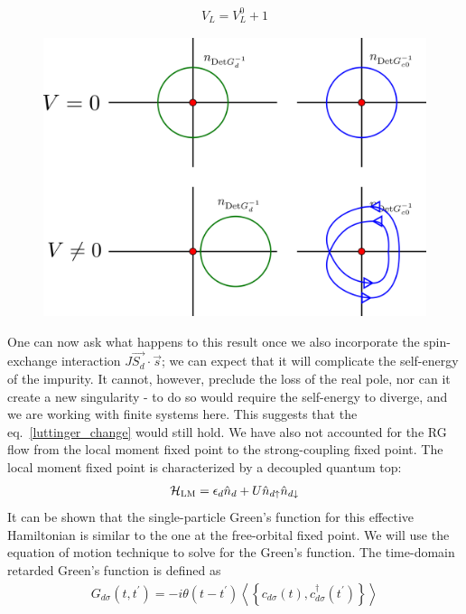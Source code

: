 \documentclass[12pt,twoside]{article}
\numberwithin{equation}{section}
\begin{document}
\begin{equation}\begin{aligned}
	\label{luttinger_change}
	V_L = V_L^0 + 1
\end{aligned}\end{equation}
\begin{figure}[htpb]
	\centering
	\includegraphics[scale=0.2]{../figures/luttinger_top_change.png}
\end{figure}
One can now ask what happens to this result once we also incorporate the spin-exchange interaction \(J \vec{S_d}\cdot\vec{s}\); we can expect that it will complicate the self-energy of the impurity. It cannot, however, preclude the loss of the real pole, nor can it create a new singularity - to do so would require the self-energy to diverge, and we are working with finite systems here. This suggests that the eq.~\ref{luttinger_change} would still hold.
\pb We have also not accounted for the RG flow from the local moment fixed point to the strong-coupling fixed point. The local moment fixed point is characterized by a decoupled quantum top:
\begin{equation}\begin{aligned}
	\mathcal{H}_\text{LM} = \epsilon_d \hat n_d + U \hat n_{d \uparrow} \hat n_{d \downarrow}
\end{aligned}\end{equation}
It can be shown that the single-particle Green's function for this effective Hamiltonian is similar to the one at the free-orbital fixed point. We will use the equation of motion technique to solve for the Green's function. The time-domain retarded Green's function is defined as
\begin{equation}\begin{aligned}
	G_{d\sigma}(t, t^\prime) = -i\theta(t-t^\prime) \left<\left\{ c_{d\sigma}(t), c^\dagger_{d\sigma}(t^\prime) \right\} \right>
\end{aligned}\end{equation}
\end{document}
